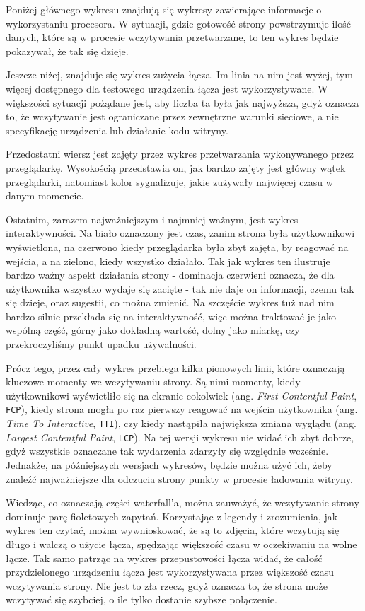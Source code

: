 \documentclass[licencjacka]{pracadypl}
\begin{document}
Poniżej głównego wykresu znajdują się wykresy zawierające informacje o wykorzystaniu procesora. W sytuacji, gdzie gotowość strony powstrzymuje ilość danych, które są w procesie wczytywania przetwarzane, to ten wykres będzie pokazywał, że tak się dzieje.

Jeszcze niżej, znajduje się wykres zużycia łącza. Im linia na nim jest wyżej, tym więcej dostępnego dla testowego urządzenia łącza jest wykorzystywane. W większości sytuacji pożądane jest, aby liczba ta była jak najwyższa, gdyż oznacza to, że wczytywanie jest ograniczane przez zewnętrzne warunki sieciowe, a nie specyfikację urządzenia lub działanie kodu witryny.

Przedostatni wiersz jest zajęty przez wykres przetwarzania wykonywanego przez przeglądarkę. Wysokością przedstawia on, jak bardzo zajęty jest główny wątek przeglądarki, natomiast kolor sygnalizuje, jakie zużywały najwięcej czasu w danym momencie.

Ostatnim, zarazem najważniejszym i najmniej ważnym, jest wykres interaktywności. Na biało oznaczony jest czas, zanim strona była użytkownikowi wyświetlona, na czerwono kiedy przeglądarka była zbyt zajęta, by reagować na wejścia, a na zielono, kiedy wszystko działało. Tak jak wykres ten ilustruje bardzo ważny aspekt działania strony - dominacja czerwieni oznacza, że dla użytkownika wszystko wydaje się zacięte - tak nie daje on informacji, czemu tak się dzieje, oraz sugestii, co można zmienić. Na szczęście wykres tuż nad nim bardzo silnie przekłada się na interaktywność, więc można traktować je jako wspólną część, górny jako dokładną wartość, dolny jako miarkę, czy przekroczyliśmy punkt upadku używalności. 

Prócz tego, przez cały wykres przebiega kilka pionowych linii, które oznaczają kluczowe momenty we wczytywaniu strony. Są nimi momenty, kiedy użytkownikowi wyświetliło się na ekranie cokolwiek (ang. \emph{First Contentful Paint}, \texttt{FCP}), kiedy strona mogła po raz pierwszy reagować na wejścia użytkownika (ang. \emph{Time To Interactive}, \texttt{TTI}), czy kiedy nastąpiła największa zmiana wyglądu (ang. \emph{Largest Contentful Paint}, \texttt{LCP}). Na tej wersji wykresu nie widać ich zbyt dobrze, gdyż wszystkie oznaczane tak wydarzenia zdarzyły się względnie wcześnie. Jednakże, na późniejszych wersjach wykresów, będzie można użyć ich, żeby znaleźć najważniejsze dla odczucia strony punkty w procesie ładowania witryny.

Wiedząc, co oznaczają części waterfall'a, można zauważyć, że wczytywanie strony dominuje parę fioletowych zapytań. Korzystając z legendy i zrozumienia, jak wykres ten czytać, można wywnioskować, że są to zdjęcia, które wczytują się długo i walczą o użycie łącza, spędzając większość czasu w oczekiwaniu na wolne łącze. Tak samo patrząc na wykres przepustowości łącza widać, że całość przydzielonego urządzeniu łącza jest wykorzystywana przez większość czasu wczytywania strony. Nie jest to zła rzecz, gdyż oznacza to, że strona może wczytywać się szybciej, o ile tylko dostanie szybsze połączenie.
\end{document}
